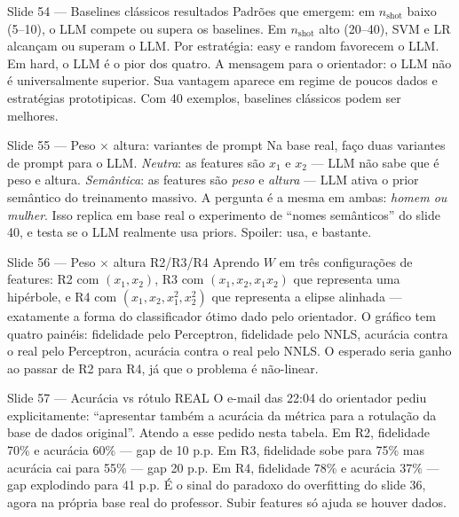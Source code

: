 \documentclass[aspectratio=169,10pt]{beamer}
\begin{document}
\begin{frame}{Slide 54 --- Baselines cl\'assicos resultados}
\footnotesize
Padr\~oes que emergem: em $n_{\text{shot}}$ baixo (5--10), o LLM compete ou supera os baselines. Em $n_{\text{shot}}$ alto (20--40), SVM e LR alcan\c{c}am ou superam o LLM. Por estrat\'egia: easy e random favorecem o LLM. Em hard, o LLM \'e o pior dos quatro. A mensagem para o orientador: o LLM n\~ao \'e universalmente superior. Sua vantagem aparece em regime de poucos dados e estrat\'egias prototipicas. Com 40 exemplos, baselines cl\'assicos podem ser melhores.
\end{frame}

\begin{frame}{Slide 55 --- Peso $\times$ altura: variantes de prompt}
\footnotesize
Na base real, fa\c{c}o duas variantes de prompt para o LLM. \emph{Neutra}: as features s\~ao $x_1$ e $x_2$ --- LLM n\~ao sabe que \'e peso e altura. \emph{Sem\^antica}: as features s\~ao \emph{peso} e \emph{altura} --- LLM ativa o prior sem\^antico do treinamento massivo. A pergunta \'e a mesma em ambas: \emph{homem ou mulher}. Isso replica em base real o experimento de ``nomes sem\^anticos'' do slide 40, e testa se o LLM realmente usa priors. Spoiler: usa, e bastante.
\end{frame}

\begin{frame}{Slide 56 --- Peso $\times$ altura R2/R3/R4}
\footnotesize
Aprendo $W$ em tr\^es configura\c{c}\~oes de features: R2 com $(x_1, x_2)$, R3 com $(x_1, x_2, x_1 x_2)$ que representa uma hip\'erbole, e R4 com $(x_1, x_2, x_1^2, x_2^2)$ que representa a elipse alinhada --- exatamente a forma do classificador \'otimo dado pelo orientador. O gr\'afico tem quatro pain\'eis: fidelidade pelo Perceptron, fidelidade pelo NNLS, acur\'acia contra o real pelo Perceptron, acur\'acia contra o real pelo NNLS. O esperado seria ganho ao passar de R2 para R4, j\'a que o problema \'e n\~ao-linear.
\end{frame}

\begin{frame}{Slide 57 --- Acur\'acia vs r\'otulo REAL}
\footnotesize
O e-mail das 22:04 do orientador pediu explicitamente: ``apresentar tamb\'em a acur\'acia da m\'etrica para a rotula\c{c}\~ao da base de dados original''. Atendo a esse pedido nesta tabela. Em R2, fidelidade 70\% e acur\'acia 60\% --- gap de 10 p.p. Em R3, fidelidade sobe para 75\% mas acur\'acia cai para 55\% --- gap 20 p.p. Em R4, fidelidade 78\% e acur\'acia 37\% --- gap explodindo para 41 p.p. \'E o sinal do paradoxo do overfitting do slide 36, agora na pr\'opria base real do professor. Subir features s\'o ajuda se houver dados.
\end{frame}
\end{document}
